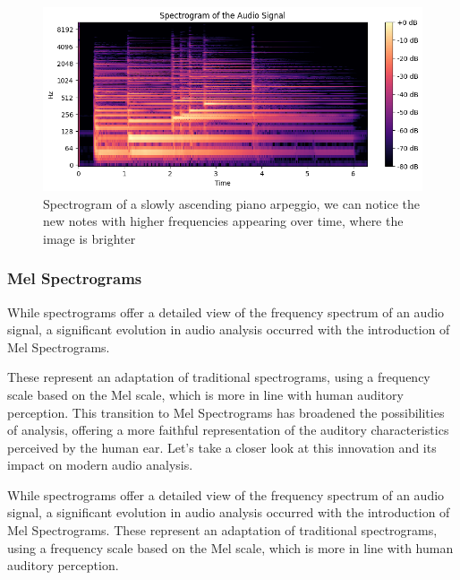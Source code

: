 \documentclass[11pt]{article}
\begin{document}
\begin{figure}[h]
  \centering
  \begin{minipage}{0.9\textwidth}
    \centering
    \includegraphics[width=1\textwidth]{"image/Spectrogram_piano.png"}
    \caption{Spectrogram of a slowly ascending piano arpeggio, we can notice the new notes with higher frequencies appearing over time, where the image is brighter}
    \label{fig:Spectrogram_piano}
  \end{minipage}\hfill
\end{figure}


\subsubsection{Mel Spectrograms}

While spectrograms offer a detailed view of the frequency spectrum of an audio signal, a significant evolution in audio analysis occurred with the introduction of Mel Spectrograms.

These represent an adaptation of traditional spectrograms, using a frequency scale based on the Mel scale, which is more in line with human auditory perception. This transition to Mel Spectrograms has broadened the possibilities of analysis, offering a more faithful representation of the auditory characteristics perceived by the human ear. Let's take a closer look at this innovation and its impact on modern audio analysis.

While spectrograms offer a detailed view of the frequency spectrum of an audio signal, a significant evolution in audio analysis occurred with the introduction of Mel Spectrograms. These represent an adaptation of traditional spectrograms, using a frequency scale based on the Mel scale, which is more in line with human auditory perception.
\end{document}
